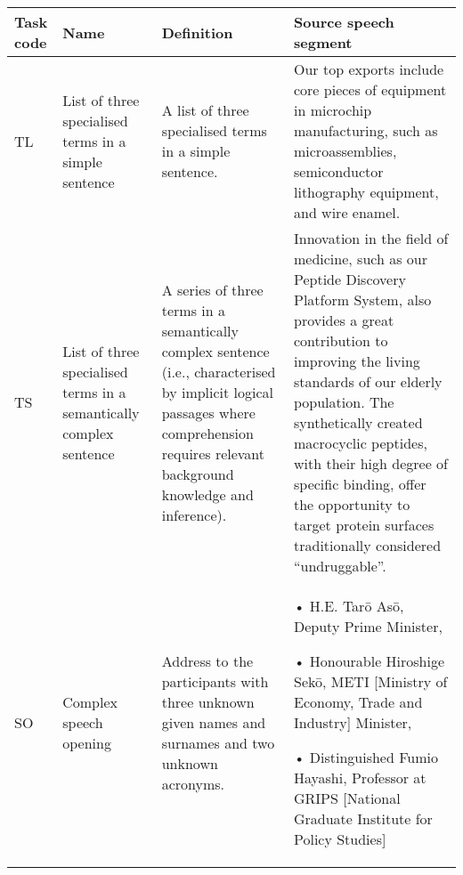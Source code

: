 \begin{sidewaystable}
\small
\begin{tabularx}{\textwidth}{l>{\raggedright\arraybackslash}p{}QQ}
\midrule
{Task code}   & {Name} & {Definition}  & {Source speech segment} \\ 
\midrule

TL                   & List of three specialised terms in a simple sentence                & A list of three specialised terms in a simple sentence.                                                                                                                                                                                                                                                                                                                                                          & Our top exports include core pieces of equipment in microchip manufacturing, such as microassemblies, semiconductor lithography equipment, and wire enamel.                                                                                                                                                                                                                                                                                                                   \\ \tablevspace

TS                   & List of three specialised terms in a semantically complex sentence & A series of three terms in a semantically  complex sentence (i.e., characterised by implicit logical passages where comprehension requires relevant background knowledge and inference).                                                                                                                                                                                                                   & Innovation in the field of medicine, such as our Peptide Discovery Platform System, also provides a great   contribution to improving the living standards of our elderly population. The synthetically created macrocyclic peptides, with their high degree of specific binding, offer the opportunity to target protein surfaces traditionally considered “undruggable”.                                                                                           \\ \tablevspace
SO  &  Complex speech opening                                               & Address to the participants with three unknown given names and surnames and two unknown acronyms.  & •   H.E. Tarō Asō, Deputy Prime Minister,

•   Honourable Hiroshige Sekō,  METI {[}Ministry of Economy, Trade and Industry{]} Minister,

•   Distinguished Fumio Hayashi,  Professor at GRIPS {[}National Graduate  Institute for Policy Studies{]} \\
\midrule
\end{tabularx}
\end{sidewaystable}





